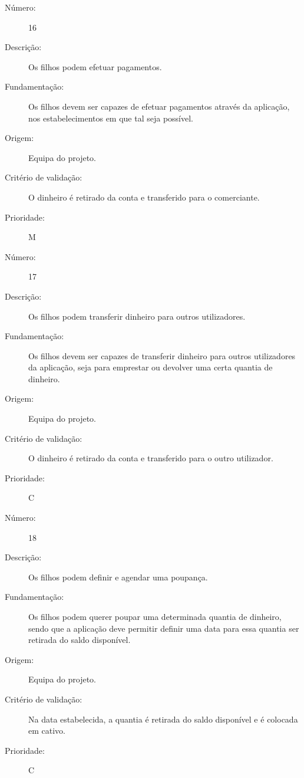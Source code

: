 \documentclass[12pt,a4paper]{article}
\begin{document}
            \begin{description}
        \item[Número:]16
        \item[Descrição:]Os filhos podem efetuar pagamentos.
        \item[Fundamentação:]Os filhos devem ser capazes de efetuar pagamentos através da aplicação, nos estabelecimentos em que tal seja possível.
        \item[Origem:]Equipa do projeto.
        \item[Critério de validação:]O dinheiro é retirado da conta e transferido para o comerciante.
        \item[Prioridade:]M
      \end{description}
\vspace{0.5cm}
            \begin{description}
        \item[Número:]17
        \item[Descrição:]Os filhos podem transferir dinheiro para outros utilizadores.
        \item[Fundamentação:]Os filhos devem ser capazes de transferir dinheiro para outros utilizadores da aplicação, seja para emprestar ou devolver uma certa quantia de dinheiro.
        \item[Origem:]Equipa do projeto.
        \item[Critério de validação:]O dinheiro é retirado da conta e transferido para o outro utilizador.
        \item[Prioridade:]C
      \end{description}
\vspace{0.5cm}
            \begin{description}
        \item[Número:]18
        \item[Descrição:]Os filhos podem definir e agendar uma poupança.
        \item[Fundamentação:]Os filhos podem querer poupar uma determinada quantia de dinheiro, sendo que a aplicação deve permitir definir uma data para essa quantia ser retirada do saldo disponível.
        \item[Origem:]Equipa do projeto.
        \item[Critério de validação:]Na data estabelecida, a quantia é retirada do saldo disponível e é colocada em cativo.
        \item[Prioridade:]C
      \end{description}
\end{document}
